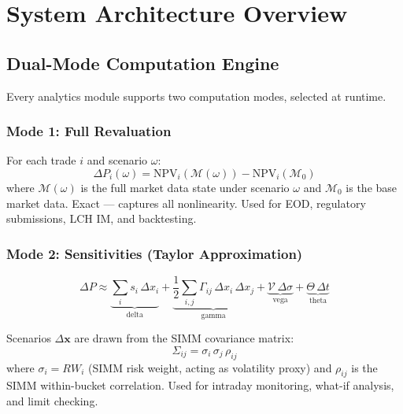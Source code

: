 \documentclass[11pt, a4paper]{article}
\begin{document}
\section{System Architecture Overview}

\subsection{Dual-Mode Computation Engine}

Every analytics module supports two computation modes, selected at runtime.

\subsubsection{Mode 1: Full Revaluation}

For each trade $i$ and scenario $\omega$:
\begin{equation}
  \Delta P_i(\omega) = \mathrm{NPV}_i\!\left(\mathcal{M}(\omega)\right)
                     - \mathrm{NPV}_i\!\left(\mathcal{M}_0\right)
\end{equation}
where $\mathcal{M}(\omega)$ is the full market data state under scenario $\omega$
and $\mathcal{M}_0$ is the base market data. Exact — captures all nonlinearity.
Used for EOD, regulatory submissions, LCH IM, and backtesting.

\subsubsection{Mode 2: Sensitivities (Taylor Approximation)}

\begin{equation}
  \Delta P \approx
    \underbrace{\sum_i s_i \,\Delta x_i}_{\text{delta}} +
    \underbrace{\frac{1}{2}\sum_{i,j} \Gamma_{ij}\,\Delta x_i\,\Delta x_j}_{\text{gamma}} +
    \underbrace{\mathcal{V}\,\Delta\sigma}_{\text{vega}} +
    \underbrace{\Theta\,\Delta t}_{\text{theta}}
\end{equation}

Scenarios $\Delta \mathbf{x}$ are drawn from the SIMM covariance matrix:
\begin{equation}
  \Sigma_{ij} = \sigma_i\,\sigma_j\,\rho_{ij}
\end{equation}
where $\sigma_i = RW_i$ (SIMM risk weight, acting as volatility proxy)
and $\rho_{ij}$ is the SIMM within-bucket correlation. Used for intraday
monitoring, what-if analysis, and limit checking.
\end{document}
